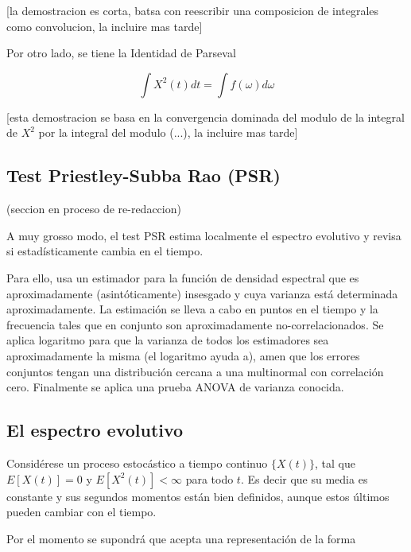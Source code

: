 [la demostracion es corta, batsa con reescribir una composicion de integrales como convolucion,
la incluire mas tarde]

Por otro lado, se tiene la Identidad de Parseval

\begin{equation*}
\int X^{2}(t) dt = \int f(\omega) d\omega
\end{equation*}

[esta demostracion se basa en la convergencia dominada del modulo de la integral de $X^{2}$ por
la integral del modulo (...), la incluire mas tarde]


\subsection{Test Priestley-Subba Rao (PSR)}

(seccion en proceso de re-redaccion)

A muy grosso modo, el test PSR estima localmente  el espectro evolutivo
 y revisa si estad\'isticamente
cambia en el tiempo.

Para ello, usa un estimador para la funci\'on de densidad espectral
que es aproximadamente (asint\'oticamente) insesgado y cuya varianza est\'a
determinada aproximadamente. La estimaci\'on se lleva a cabo en puntos en el tiempo y
la frecuencia tales que en conjunto son aproximadamente no-correlacionados.
Se aplica logaritmo para que la varianza de todos los estimadores sea aproximadamente
la misma (el logaritmo ayuda a), amen que los errores conjuntos tengan una
distribuci\'on cercana a una multinormal con correlaci\'on cero.
Finalmente se aplica una prueba ANOVA de varianza conocida.


\subsection{El espectro evolutivo}

Consid\'erese un proceso estoc\'astico a tiempo continuo $\{X(t)\}$, tal que
$E[X(t)]=0$ y $E\left[ X^{2}(t)\right] < \infty$ para todo $t$. Es decir que su media es constante
y sus segundos momentos est\'an bien definidos, aunque 
estos \'ultimos pueden cambiar con el tiempo.

Por el momento se supondr\'a que acepta una representaci\'on de la forma

